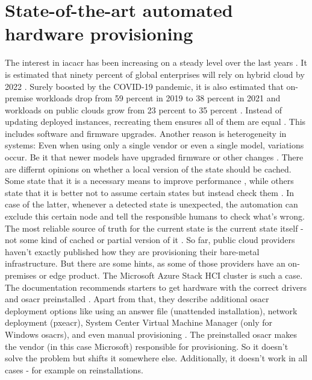 \section{State-of-the-art automated hardware provisioning}
The interest in \gls{iacacr} has been increasing on a steady level over the last years \cite{googletrends_iac}. It is estimated that ninety percent of global enterprises will rely on hybrid cloud by 2022 \cite{idc_covid_multicloud}.
Surely boosted by the COVID-19 pandemic, it is also estimated that on-premise workloads drop from 59 percent in 2019 to 38 percent in 2021 and workloads on public clouds grow from 23 percent to 35 percent \cite{thestreet_public_cloud_spending_covid}.
\newline
Instead of updating deployed instances, recreating them ensures all of them are equal \cite{iac_bare_metal}. This includes software and firmware upgrades.
\newline
Another reason is heterogeneity in systems: Even when using only a single vendor or even a single model, variations occur. Be it that newer models have upgraded firmware or other  changes \cite{iac_bare_metal}.
\newline
There are differnt opinions on whether a local version of the state should be cached. Some state that it is a necessary means to improve performance \cite{terraform_state}, while others state that it is better not to assume certain states but instead check them \cite{iac_bare_metal}. In case of the latter, whenever a detected state is unexpected, the automation can exclude this certain node and tell the responsible humans to check what's wrong. The most reliable source of truth for the current state is the current state itself - not some kind of cached or partial version of it \cite{iac_bare_metal}.
\newline
So far, public cloud providers haven't exactly published how they are provisioning their bare-metal infrastructure.
\newline
But there are some hints, as some of those providers have an on-premises or edge product. The Microsoft Azure Stack HCI cluster is such a case. The documentation recommends starters to get hardware with the correct drivers and \gls{osacr} preinstalled \cite{microsoft_azure_stack_deployment}. Apart from that, they describe additional \gls{osacr} deployment options like using an answer file (unattended installation), network deployment (\gls{pxeacr}), System Center Virtual Machine Manager (only for Windows \gls{osacr}s), and even manual provisioning \cite{microsoft_azure_stack_deployment}. The preinstalled \gls{osacr} makes the vendor (in this case Microsoft) responsible for provisioning. So it doesn't solve the problem but shifts it somewhere else. Additionally, it doesn't work in all cases - for example on reinstallations.
